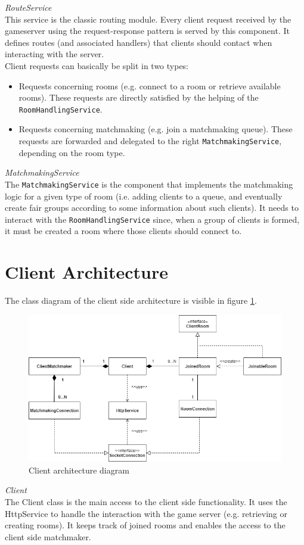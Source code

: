 \bigskip
\textit{RouteService}
\\
This service is the classic routing module.
Every client request received by the gameserver using the request-response pattern is served by this component.
It defines routes (and associated handlers) that clients should contact when interacting with the server.
\\
Client requests can basically be split in two types:
\begin{itemize}
	\item Requests concerning rooms (e.g. connect to a room or retrieve available rooms). These requests are directly satisfied by the helping of the \texttt{RoomHandlingService}.
	\item Requests concerning matchmaking (e.g. join a matchmaking queue). These requests are forwarded and delegated to the right \texttt{MatchmakingService}, depending on the room type.
\end{itemize}

\bigskip
\textit{MatchmakingService}
\\
The \texttt{MatchmakingService} is the component that implements the matchmaking logic for a given type of room (i.e. adding clients to a queue, and eventually create fair groups according to some information about such clients). It needs to interact with the \texttt{RoomHandlingService} since, when a group of clients is formed, it must be created a room where those clients should connect to.


\section{Client Architecture}

The class diagram of the client side architecture is visible in figure \ref{fig:client_architecture}. 
\begin{figure}[H]
	\centering
	\includegraphics[scale=0.65]{images/3-architecture/client-architecture.png}
	\caption{Client architecture diagram}
	\label{fig:client_architecture}
\end{figure}
\bigskip
\textit{Client}
\\
The Client class is the main access to the client side functionality.
It uses the HttpService to handle the interaction with the game server (e.g. retrieving or creating rooms).
It keeps track of joined rooms and enables the access to the client side matchmaker.

